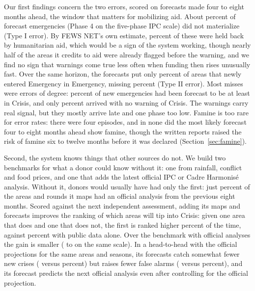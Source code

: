 \documentclass[11pt]{article}
\begin{document}
Our first findings concern the two errors, scored on forecasts made four to eight months ahead, the window that matters for mobilizing aid. About \tIfailed{} percent of forecast emergencies (Phase 4 on the five-phase IPC scale) did not materialize (Type I error). By FEWS NET's own estimate, \tIfailFlagShare{} percent of these were held back by humanitarian aid, which would be a sign of the system working, though nearly half of the areas it credits to aid were already flagged before the warning, and we find no sign that warnings come true less often when funding then rises unusually fast. Over the same horizon, the forecasts put only \tIIearlyEmergency{} percent of areas that newly entered Emergency in Emergency, missing \tIIearlyMiss{} percent (Type II error). Most misses were errors of degree: \tIIearlyCrisisPlus{} percent of new emergencies had been forecast to be at least in Crisis, and only \tIInoWarning{} percent arrived with no warning of Crisis. The warnings carry real signal, but they mostly arrive late and one phase too low. Famine is too rare for error rates: there were four episodes, and in none did the most likely forecast four to eight months ahead show famine, though the written reports raised the risk of famine six to twelve months before it was declared (Section~\ref{sec:famine}).

Second, the system knows things that other sources do not. We build two benchmarks for what a donor could know without it: one from rainfall, conflict and food prices, and one that adds the latest official IPC or Cadre Harmonis\'e analysis. Without it, donors would usually have had only the first: just \shareWithIndependent{} percent of the areas and rounds it maps had an official analysis from the previous eight months. Scored against the next independent assessment, adding its maps and forecasts improves the ranking of which areas will tip into Crisis: given one area that does and one that does not, the first is ranked higher \aucRawFewsPct{} percent of the time, against \aucRawPct{} percent with public data alone. Over the benchmark with official analyses the gain is smaller (\aucRawIPC{} to \aucRawIPCFews{} on the same scale). In a head-to-head with the official projections for the same areas and seasons, its forecasts catch somewhat fewer new crises (\offHitFews{} versus \offHitOfficial{} percent) but raises fewer false alarms (\offFaFews{} versus \offFaOfficial{} percent), and its forecast predicts the next official analysis even after controlling for the official projection.
\end{document}
